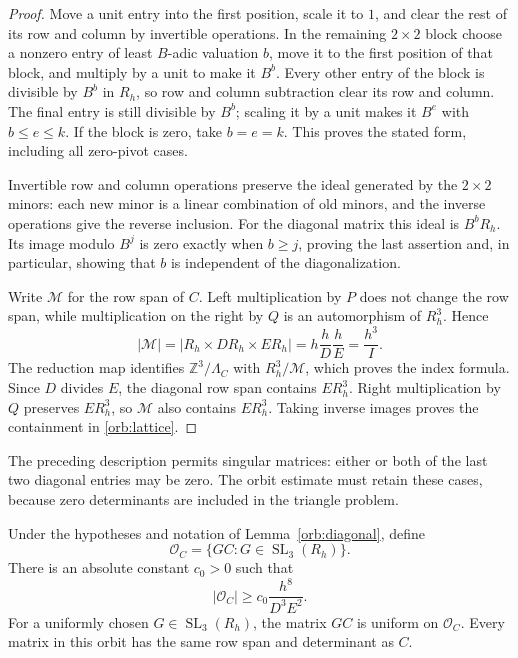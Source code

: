\begin{proof}
Move a unit entry into the first position, scale it to $1$, and clear the
rest of its row and column by invertible operations.  In the remaining
$2\times2$ block choose a nonzero entry of least $B$-adic valuation $b$,
move it to the first position of that block, and multiply by a unit to
make it $B^b$.  Every other entry of the block is divisible by $B^b$ in
$R_h$, so row and column subtraction clear its row and column.  The final
entry is still divisible by $B^b$; scaling it by a unit makes it $B^e$
with $b\leq e\leq k$.  If the block is zero, take $b=e=k$.
This proves the stated form, including all zero-pivot cases.

Invertible row and column operations preserve the ideal generated by
the $2\times2$ minors: each new minor is a linear combination of old
minors, and the inverse operations give the reverse inclusion.  For the
diagonal matrix this ideal is $B^bR_h$.  Its image modulo $B^j$ is zero
exactly when $b\geq j$, proving the last assertion and, in particular,
showing that $b$ is independent of the diagonalization.

Write $\mathscr M$ for the row span of $C$.  Left multiplication by $P$ does not
change the row span, while multiplication on the right by $Q$ is an
automorphism of $R_h^3$.  Hence
\[
 |\mathscr M|=|R_h\times DR_h\times ER_h|
      =h\frac hD\frac hE=\frac{h^3}{I}.
\]
The reduction map identifies $\mathbb Z^3/\Lambda_C$ with $R_h^3/\mathscr M$,
which proves the index formula.  Since $D$ divides $E$, the diagonal row
span contains $ER_h^3$.  Right multiplication by $Q$ preserves
$ER_h^3$, so $\mathscr M$ also contains $ER_h^3$.  Taking inverse images proves
the containment in \eqref{orb:lattice}.
\end{proof}

The preceding description permits singular matrices: either or both of
the last two diagonal entries may be zero.  The orbit estimate must
retain these cases, because zero determinants are included in the
triangle problem.

\begin{lemma}
\label{orb:orbit}
Under the hypotheses and notation of Lemma~\ref{orb:diagonal}, define
\[
 \mathcal O_C=\{GC:G\in\operatorname{SL}_3(R_h)\}.
\]
There is an absolute constant $c_0>0$ such that
\begin{equation}
 |\mathcal O_C|\geq c_0\frac{h^8}{D^3E^2}.
 \label{orb:orbit-bound}
\end{equation}
For a uniformly chosen $G\in\operatorname{SL}_3(R_h)$, the matrix $GC$
is uniform on $\mathcal O_C$.  Every matrix in this orbit has the same
row span and determinant as $C$.
\end{lemma}

